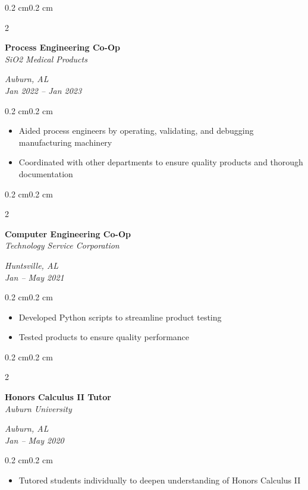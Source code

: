 \documentclass[10pt, letterpaper]{article}
\newenvironment{highlights}{
    \begin{itemize}[topsep=0.10 cm,parsep=0.10 cm,partopsep=0pt,itemsep=0pt,leftmargin=0.4 cm + 10pt]
}{
    \end{itemize}
}
\newenvironment{onecolentry}{
    \begin{adjustwidth}{0.2 cm}{0.2 cm}
}{
    \end{adjustwidth}
}
\newenvironment{twocolentry}[2][]{
    \onecolentry
    \def\secondColumn{#2}
    \setcolumnwidth{\fill, 4.5 cm}
    \begin{paracol}{2}
}{
    \switchcolumn \raggedleft \secondColumn
    \end{paracol}
    \endonecolentry
}
\begin{document}
        \begin{twocolentry}{\textit{Auburn, AL} \\ \textit{Jan 2022 – Jan 2023}}
            \textbf{Process Engineering Co-Op} \\
            \textit{SiO2 Medical Products}
        \end{twocolentry}
        \vspace{0.10 cm}
        \begin{onecolentry}
            \begin{highlights}
                \item Aided process engineers by operating, validating, and debugging manufacturing machinery
                \item Coordinated with other departments to ensure quality products and thorough documentation
            \end{highlights}
        \end{onecolentry}

        \vspace{0.2 cm}

        \begin{twocolentry}{\textit{Huntsville, AL} \\ \textit{Jan – May 2021}}
            \textbf{Computer Engineering Co-Op} \\
            \textit{Technology Service Corporation}
        \end{twocolentry}
        \vspace{0.10 cm}
        \begin{onecolentry}
            \begin{highlights}
                \item Developed Python scripts to streamline product testing
                \item Tested products to ensure quality performance
            \end{highlights}
        \end{onecolentry}

        \vspace{0.2 cm}

        \begin{twocolentry}{\textit{Auburn, AL} \\ \textit{Jan – May 2020}}
            \textbf{Honors Calculus II Tutor} \\
            \textit{Auburn University}
        \end{twocolentry}
        \vspace{0.10 cm}
        \begin{onecolentry}
            \begin{highlights}
                \item Tutored students individually to deepen understanding of Honors Calculus II
            \end{highlights}
        \end{onecolentry}
\end{document}
